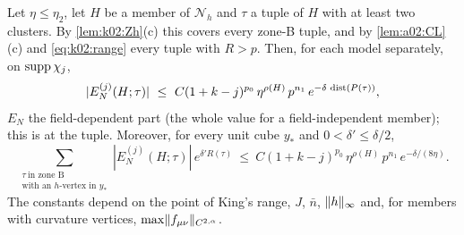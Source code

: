 \begin{proposition}\label{prop:k02:KhR}
Let $\eta\le\eta_2$, let $H$ be a member of $\mathcal N_h$ and $\tau$ a tuple of $H$ with at least two clusters. By \cref{lem:k02:Zh}(c) this covers every zone-B tuple, and by \cref{lem:a02:CL}(c) and \eqref{eq:k02:range} every tuple with $R>p$. Then, for each model separately, on $\operatorname{supp}\chi_j$,
\begin{equation}\label{eq:k02:R1}
|E^{(j)}_N(H;\tau)|\ \le\ C(1+k-j)^{p_0}\,\eta^{\rho(H)}\,p^{n_1}\,e^{-\delta\,\dist(P(\tau))},
\end{equation}
$E_N$ the field-dependent part (the whole value for a field-independent member); this is \cite[(3.38)]{K1} at the tuple. Moreover, for every unit cube $y_*$ and $0<\delta'\le\delta/2$,
\begin{equation}\label{eq:k02:R2}
\sum_{\substack{\tau\ \text{in zone B}\\ \text{with an $h$-vertex in }y_*}}|E^{(j)}_N(H;\tau)|\,e^{\delta'R(\tau)}\ \le\ C(1+k-j)^{p_0}\,\eta^{\rho(H)}\,p^{n_1}\,e^{-\delta/(8\eta)} .
\end{equation}
The constants depend on the point of King's range, $J$, $\bar n$, $\lVert h\rVert_\infty$ and, for members with curvature vertices, $\max\lVert f_{\mu\nu}\rVert_{C^{2,\alpha}}$.
\end{proposition}
